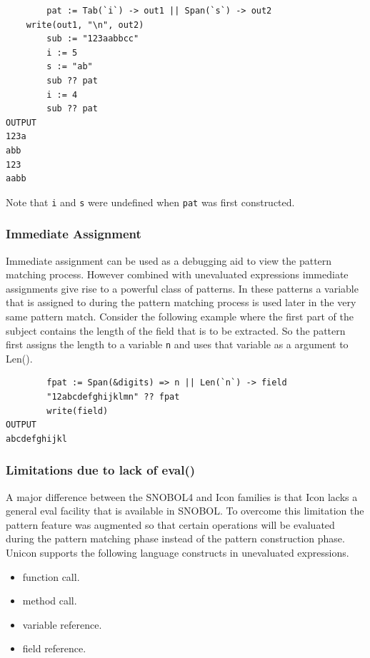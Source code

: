 \documentclass[letterpaper,12pt]{article}
\begin{document}
\begin{verbatim}
        pat := Tab(`i`) -> out1 || Span(`s`) -> out2
	write(out1, "\n", out2)
        sub := "123aabbcc"
        i := 5
        s := "ab"
        sub ?? pat
        i := 4
        sub ?? pat
OUTPUT
123a
abb
123
aabb
\end{verbatim}

Note that \texttt{i} and \texttt{s} were undefined when \texttt{pat}
was first constructed.

\subsubsection{Immediate Assignment}

Immediate assignment can be used as a debugging aid to view the
pattern matching process. However combined with unevaluated
expressions immediate assignments give rise to a powerful class of
patterns. In these patterns a variable that is assigned to during the
pattern matching process is used later in the very same pattern match.
Consider the following example where the first part of the subject
contains the length of the field that is to be extracted. So the
pattern first assigns the length to a variable \texttt{n} and uses
that variable as a argument to Len().

\begin{verbatim}
        fpat := Span(&digits) => n || Len(`n`) -> field        
        "12abcdefghijklmn" ?? fpat
        write(field)
OUTPUT
abcdefghijkl
\end{verbatim}

\subsubsection{Limitations due to lack of eval()}

A major difference between the SNOBOL4 and Icon families is that Icon
lacks a general eval facility that is available in SNOBOL. To overcome
this limitation the pattern feature was augmented so that certain
operations will be evaluated during the pattern matching phase instead
of the pattern construction phase.  Unicon supports the following
language constructs in unevaluated expressions.

\begin{itemize}
\item function call.
\item method call.
\item variable reference.
\item field reference.
\end{itemize}
\end{document}
